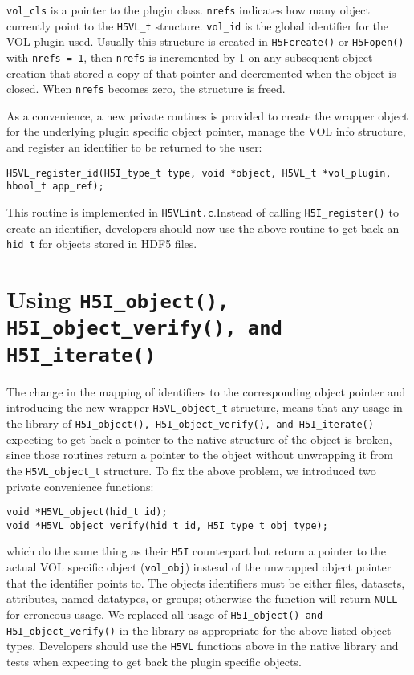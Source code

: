 {\tt vol\_cls} is a pointer to the plugin class. {\tt nrefs} indicates how many object currently point to the {\tt H5VL\_t} structure. {\tt vol\_id} is the global identifier for the VOL plugin used. Usually this structure is created in {\tt H5Fcreate()} or {\tt H5Fopen()} with {\tt nrefs = 1}, then {\tt nrefs} is incremented by 1 on any subsequent object creation that stored a copy of that pointer and decremented when the object is closed. When {\tt nrefs} becomes zero, the structure is freed. 

As a convenience, a new private routines is provided to create the wrapper object for the underlying plugin specific object pointer, manage the VOL info structure, and register an identifier to be returned to the user:

\begin{lstlisting}
H5VL_register_id(H5I_type_t type, void *object, H5VL_t *vol_plugin, hbool_t app_ref);
\end{lstlisting}

This routine is implemented in {\tt H5VLint.c}.Instead of calling {\tt H5I\_register()} to create an identifier, developers should now use the above routine to get back an {\tt hid\_t} for objects stored in HDF5 files.

\section{Using {\tt H5I\_object(), H5I\_object\_verify(), and H5I\_iterate()}}
The change in the mapping of identifiers to the corresponding object pointer and introducing the new wrapper {\tt H5VL\_object\_t} structure, means that any usage in the library of {\tt H5I\_object(), H5I\_object\_verify(), and H5I\_iterate()} expecting to get back a pointer to the native structure of the object is broken, since those routines return a pointer to the object without unwrapping it from the {\tt H5VL\_object\_t} structure. To fix the above problem, we introduced two private convenience functions:
\begin{lstlisting}
void *H5VL_object(hid_t id);
void *H5VL_object_verify(hid_t id, H5I_type_t obj_type);
\end{lstlisting}

which do the same thing as their {\tt H5I} counterpart but return a pointer to the actual VOL specific object ({\tt vol\_obj}) instead of the unwrapped object pointer that the identifier points to. The objects identifiers must be either files, datasets, attributes, named datatypes, or groups; otherwise the function will return {\tt NULL} for erroneous usage. We replaced all usage of {\tt H5I\_object() and H5I\_object\_verify()} in the library as appropriate for the above listed object types. Developers should use the {\tt H5VL} functions above in the native library and tests when expecting to get back the plugin specific objects.

